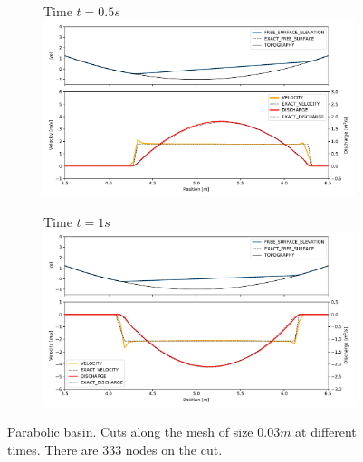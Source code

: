 \documentclass[a4paper,12pt]{article}
\begin{document}
\begin{figure}[H]
\begin{subfigure}{\textwidth}
    \centering
    Time $t=0.5s$
    \includegraphics[width=\textwidth]{img/par/parabola_t0.5.pdf}
\end{subfigure}
\par\medskip
\begin{subfigure}{\textwidth}
    \centering
    Time $t=1s$
    \includegraphics[width=\textwidth]{img/par/parabola_t1.0.pdf}
\end{subfigure}
\caption{Parabolic basin. Cuts along the mesh of size $0.03m$ at different times. There are 333 nodes on the cut.}
\label{parabola_graphic}
\end{figure}
\end{document}
